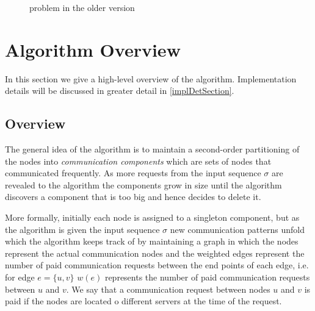 \documentclass[xcolor=dvipsnames, tikz, 12pt]{article}
\newcommand{\request}[3]{\draw (axis cs:#3,#1) -- node[left]{} (axis cs:#3,#2);}
\theoremstyle{definition}
\begin{document}
\begin{figure}
	\caption{problem in the older version}\label{exOldCrep}
	
\end{figure}
	
	
	
	\section{Algorithm Overview}
	In this section we give a high-level overview of the algorithm. Implementation details will be discussed in greater detail in \cref{implDetSection}.
	
	\subsection{Overview}
	The general idea of the algorithm is to maintain a second-order partitioning of the nodes into \textit{communication components} which are sets of nodes that communicated frequently. As more requests from the input sequence $\sigma$ are revealed to the algorithm the components grow in size until the algorithm discovers a component that is too big and hence decides to delete it.
	
	More formally, initially each node is assigned to a singleton component, but as the algorithm is given the input sequence $\sigma$ new communication patterns unfold which the algorithm keeps track of by maintaining a graph in which the nodes represent the actual communication nodes and the weighted edges represent the number of paid communication requests between the end points of each edge, i.e. for edge $e=\{u,v\}$ $w(e)$ represents the number of paid communication requests between $u$ and $v$. We say that a communication request between nodes $u$ and $v$ is paid if the nodes are located o different servers at the time of the request.
	
\end{document}
